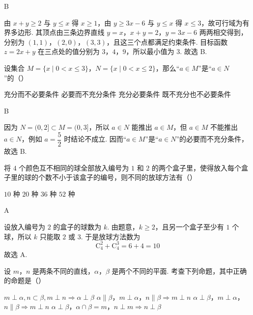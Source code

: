 \begin{answer}
B
\end{answer}

\begin{solution}
由 \(x+y\geqslant2\) 与 \(y\leqslant x\) 得 \(x\geqslant1\)，由 \(y\geqslant3x-6\) 与 \(y\leqslant x\) 得 \(x\leqslant3\)，故可行域为有界多边形. 其顶点由三条边界直线 \(y=x\)，\(x+y=2\)，\(y=3x-6\) 两两相交得到，分别为 \((1,1)\)，\((2,0)\)，\((3,3)\)，且这三个点都满足约束条件. 目标函数 \(z=2x+y\) 在三点处的值分别为 \(3\)，\(4\)，\(9\)，所以最小值为 \(3\). 故选 B.
\end{solution}

\begin{problem}
设集合 \(M=\{x\mid 0<x\leqslant 3\}\)，\(N=\{x\mid 0<x\leqslant 2\}\)，那么“\(a\in M\)”是“\(a\in N\)”的（\quad）

\choices
    {充分而不必要条件}
    {必要而不充分条件}
    {充分必要条件}
    {既不充分也不必要条件}
\end{problem}

\begin{answer}
B
\end{answer}

\begin{solution}
因为 \(N=(0,2]\subset M=(0,3]\)，所以 \(a\in N\) 能推出 \(a\in M\)，但 \(a\in M\) 不能推出 \(a\in N\)，例如 \(a=\dfrac{5}{2}\) 时结论不成立. 因而“\(a\in M\)”是“\(a\in N\)”的必要而不充分条件，故选 B.
\end{solution}

\begin{problem}
将 \(4\) 个颜色互不相同的球全部放入编号为 \(1\) 和 \(2\) 的两个盒子里，使得放入每个盒子里的球的个数不小于该盒子的编号，则不同的放球方法有（\quad）

\choices
    {\(10\) 种}
    {\(20\) 种}
    {\(36\) 种}
    {\(52\) 种}
\end{problem}

\begin{answer}
A
\end{answer}

\begin{solution}
设放入编号为 \(2\) 的盒子的球数为 \(k\). 由题意，\(k\geqslant2\)，且另一个盒子至少有 \(1\) 个球，所以 \(k\) 只能取 \(2\) 或 \(3\). 于是放球方法数为
\[
\mathrm C_{4}^{2}+\mathrm C_{4}^{3}=6+4=10
\]
故选 A.
\end{solution}

\begin{problem}
设 \(m\)，\(n\) 是两条不同的直线，\(\alpha\)，\(\beta\) 是两个不同的平面. 考查下列命题，其中正确的命题是（\quad）

\choices
    {\(m\perp\alpha, n\subset\beta, m\perp n \Rightarrow \alpha\perp\beta\)}
    {\(\alpha\parallel\beta\)，\(m\perp\alpha\)，\(n\parallel\beta \Rightarrow m\perp n\)}
    {\(\alpha\perp\beta\)，\(m\perp\alpha\)，\(n\parallel\beta \Rightarrow m\perp n\)}
    {\(\alpha\perp\beta\)，\(\alpha\cap\beta=m\)，\(n\perp m \Rightarrow n\perp\beta\)}
\end{problem}

